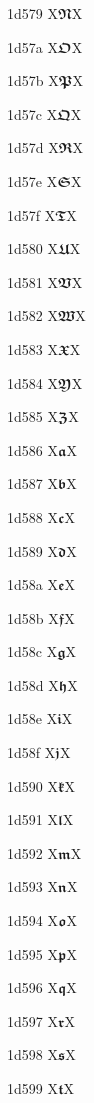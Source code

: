 \documentclass[11pt]{article}
\begin{document}
1d579 X{\ensuremath{\mathbffrak{N}}}X

1d57a X{\ensuremath{\mathbffrak{O}}}X

1d57b X{\ensuremath{\mathbffrak{P}}}X

1d57c X{\ensuremath{\mathbffrak{Q}}}X

1d57d X{\ensuremath{\mathbffrak{R}}}X

1d57e X{\ensuremath{\mathbffrak{S}}}X

1d57f X{\ensuremath{\mathbffrak{T}}}X

1d580 X{\ensuremath{\mathbffrak{U}}}X

1d581 X{\ensuremath{\mathbffrak{V}}}X

1d582 X{\ensuremath{\mathbffrak{W}}}X

1d583 X{\ensuremath{\mathbffrak{X}}}X

1d584 X{\ensuremath{\mathbffrak{Y}}}X

1d585 X{\ensuremath{\mathbffrak{Z}}}X

1d586 X{\ensuremath{\mathbffrak{a}}}X

1d587 X{\ensuremath{\mathbffrak{b}}}X

1d588 X{\ensuremath{\mathbffrak{c}}}X

1d589 X{\ensuremath{\mathbffrak{d}}}X

1d58a X{\ensuremath{\mathbffrak{e}}}X

1d58b X{\ensuremath{\mathbffrak{f}}}X

1d58c X{\ensuremath{\mathbffrak{g}}}X

1d58d X{\ensuremath{\mathbffrak{h}}}X

1d58e X{\ensuremath{\mathbffrak{i}}}X

1d58f X{\ensuremath{\mathbffrak{j}}}X

1d590 X{\ensuremath{\mathbffrak{k}}}X

1d591 X{\ensuremath{\mathbffrak{l}}}X

1d592 X{\ensuremath{\mathbffrak{m}}}X

1d593 X{\ensuremath{\mathbffrak{n}}}X

1d594 X{\ensuremath{\mathbffrak{o}}}X

1d595 X{\ensuremath{\mathbffrak{p}}}X

1d596 X{\ensuremath{\mathbffrak{q}}}X

1d597 X{\ensuremath{\mathbffrak{r}}}X

1d598 X{\ensuremath{\mathbffrak{s}}}X

1d599 X{\ensuremath{\mathbffrak{t}}}X
\end{document}
